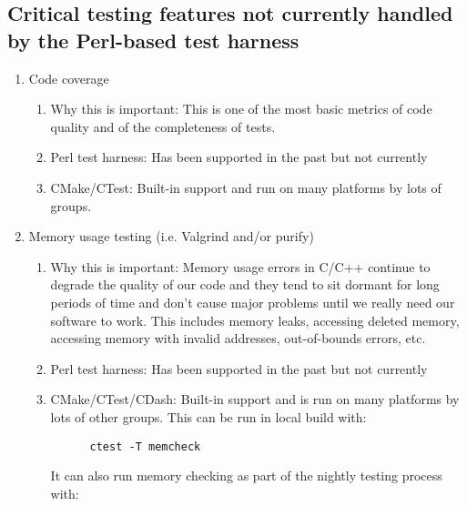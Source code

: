 \documentclass[pdf,ps2pdf,11pt]{SANDreport}
\begin{document}
%
{}\subsection{Critical testing features not currently handled by the
Perl-based test harness}
%

\begin{enumerate}

{}\item Code coverage

  \begin{enumerate}

  {}\item Why this is important: This is one of the most basic
  metrics of code quality and of the completeness of tests.

  {}\item Perl test harness: Has been supported in the past but not
  currently

  {}\item CMake/CTest: Built-in support and run on many platforms by
  lots of groups.

  \end{enumerate}

{}\item Memory usage testing (i.e. Valgrind and/or purify)

  \begin{enumerate}

  {}\item Why this is important: Memory usage errors in C/C++
  continue to degrade the quality of our code and they tend to sit
  dormant for long periods of time and don't cause major problems
  until we really need our software to work.  This includes memory
  leaks, accessing deleted memory, accessing memory with invalid
  addresses, out-of-bounds errors, etc.

  {}\item Perl test harness: Has been supported in the past but not
  currently

  {}\item CMake/CTest/CDash: Built-in support and is run on many
  platforms by lots of other groups.  This can be run in local build
  with:

    \begin{verbatim}
      ctest -T memcheck
    \end{verbatim}

  It can also run memory checking as part of the nightly testing
  process with:


\end{enumerate}
\end{enumerate}
\end{document}
